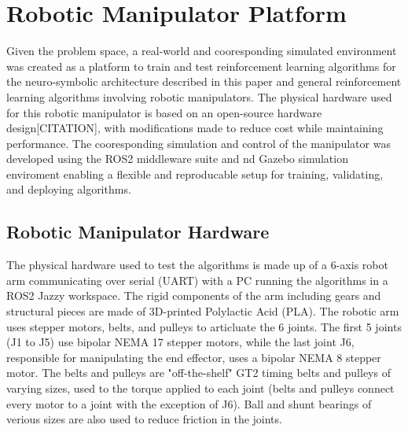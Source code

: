 \chapter{Robotic Manipulator Platform}
Given the problem space, a real-world and cooresponding simulated environment was created as a platform to train and test reinforcement learning algorithms for the neuro-symbolic architecture described in this paper and general reinforcement learning algorithms involving robotic manipulators.
The physical hardware used for this robotic manipulator is based on an open-source hardware design[CITATION], with modifications made to reduce cost while maintaining performance.
The cooresponding simulation and control of the manipulator was developed using the ROS2 middleware suite and nd Gazebo simulation enviroment enabling a flexible and reproducable setup for training, validating, and deploying algorithms.

\section{Robotic Manipulator Hardware}  \label{se:robotic_manipulator_hardware}
The physical hardware used to test the algorithms is made up of a 6-axis robot arm communicating over serial (UART) with a PC running the algorithms in a ROS2 Jazzy workspace.
The rigid components of the arm including gears and structural pieces are made of 3D-printed Polylactic Acid (PLA).
The robotic arm uses stepper motors, belts, and pulleys to articluate the 6 joints. 
The first 5 joints (J1 to J5) use bipolar NEMA 17 stepper motors, while the last joint J6, responsible for manipulating the end effector, uses a bipolar NEMA 8 stepper motor.
The belts and pulleys are "off-the-shelf" GT2 timing belts and pulleys of varying sizes, used to the torque applied to each joint (belts and pulleys connect every motor to a joint with the exception of J6).
Ball and shunt bearings of verious sizes are also used to reduce friction in the joints.

